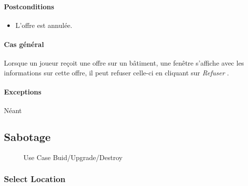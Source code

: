 \documentclass[a4paper,11pt]{report}
\begin{document}
\paragraph{Postconditions}
\begin{itemize}
 \item L'offre est annulée.
\end{itemize}
\paragraph{Cas général}
Lorsque un joueur reçoit une offre sur un bâtiment, une fenêtre s'affiche avec les informations sur cette offre, il peut refuser celle-ci en cliquant sur \og \textit{Refuser} \fg.
\paragraph{Exceptions} Néant






\newpage
\subsection{Sabotage}
\begin{figure}[ht]
	\caption{Use Case Buid/Upgrade/Destroy}
\end{figure}

\subsubsection{Select Location}
\end{document}
